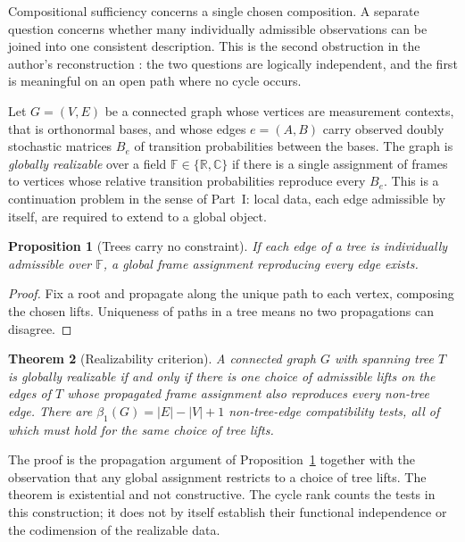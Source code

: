 \documentclass[11pt,oneside]{book}
\newtheorem{theorem}{Theorem}[chapter]
\newtheorem{proposition}[theorem]{Proposition}
\theoremstyle{definition}
\theoremstyle{remark}
\begin{document}
Compositional sufficiency concerns a single chosen composition. A separate question concerns whether many individually admissible observations can be joined into one consistent description. This is the second obstruction in the author's reconstruction \cite{flyxion2026uqm}: the two questions are logically independent, and the first is meaningful on an open path where no cycle occurs.

Let $G=(V,E)$ be a connected graph whose vertices are measurement contexts, that is orthonormal bases, and whose edges $e=(A,B)$ carry observed doubly stochastic matrices $B_e$ of transition probabilities between the bases. The graph is \emph{globally realizable} over a field $\mathbb F\in\{\mathbb R,\mathbb C\}$ if there is a single assignment of frames to vertices whose relative transition probabilities reproduce every $B_e$. This is a continuation problem in the sense of Part~I: local data, each edge admissible by itself, are required to extend to a global object.

\begin{proposition}[Trees carry no constraint]\label{prop:tree}
If each edge of a tree is individually admissible over $\mathbb F$, a global frame assignment reproducing every edge exists.
\end{proposition}

\begin{proof}
Fix a root and propagate along the unique path to each vertex, composing the chosen lifts. Uniqueness of paths in a tree means no two propagations can disagree.
\end{proof}

\begin{theorem}[Realizability criterion]\label{thm:realizability}
A connected graph $G$ with spanning tree $T$ is globally realizable if and only if there is one choice of admissible lifts on the edges of $T$ whose propagated frame assignment also reproduces every non-tree edge. There are $\beta_1(G)=|E|-|V|+1$ non-tree-edge compatibility tests, all of which must hold for the same choice of tree lifts.
\end{theorem}

The proof is the propagation argument of Proposition~\ref{prop:tree} together with the observation that any global assignment restricts to a choice of tree lifts. The theorem is existential and not constructive. The cycle rank counts the tests in this construction; it does not by itself establish their functional independence or the codimension of the realizable data.
\end{document}
